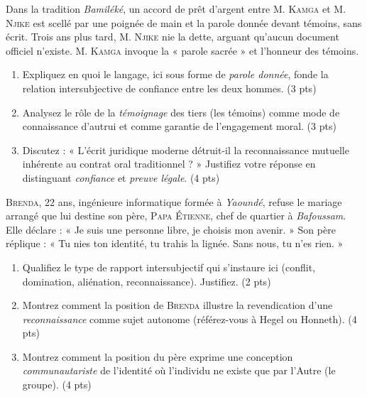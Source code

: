 \documentclass[11pt]{article}
\begin{document}
\begin{exercice}
Dans la tradition \textit{Bamiléké}, un accord de prêt d'argent entre M. \textsc{Kamga} et M. \textsc{Njike} est scellé par une poignée de main et la parole donnée devant témoins, sans écrit. Trois ans plus tard, M. \textsc{Njike} nie la dette, arguant qu'aucun document officiel n'existe. M. \textsc{Kamga} invoque la « parole sacrée » et l'honneur des témoins.
\begin{enumerate}
    \item Expliquez en quoi le langage, ici sous forme de \textit{parole donnée}, fonde la relation intersubjective de confiance entre les deux hommes. (3 pts)
    \item Analysez le rôle de la \textit{témoignage} des tiers (les témoins) comme mode de connaissance d'autrui et comme garantie de l'engagement moral. (3 pts)
    \item Discutez : « L'écrit juridique moderne détruit-il la reconnaissance mutuelle inhérente au contrat oral traditionnel ? » Justifiez votre réponse en distinguant \textit{confiance} et \textit{preuve légale}. (4 pts)
\end{enumerate}
\end{exercice}

\begin{exercice}
\textsc{Brenda}, 22 ans, ingénieure informatique formée à \textit{Yaoundé}, refuse le mariage arrangé que lui destine son père, \textsc{Papa Étienne}, chef de quartier à \textit{Bafoussam}. Elle déclare : « Je suis une personne libre, je choisis mon avenir. » Son père réplique : « Tu nies ton identité, tu trahis la lignée. Sans nous, tu n'es rien. »
\begin{enumerate}
    \item Qualifiez le type de rapport intersubjectif qui s'instaure ici (conflit, domination, aliénation, reconnaissance). Justifiez. (2 pts)
    \item Montrez comment la position de \textsc{Brenda} illustre la revendication d'une \textit{reconnaissance} comme sujet autonome (référez-vous à Hegel ou Honneth). (4 pts)
    \item Montrez comment la position du père exprime une conception \textit{communautariste} de l'identité où l'individu ne existe que par l'Autre (le groupe). (4 pts)
\end{enumerate}
\end{exercice}
\end{document}
